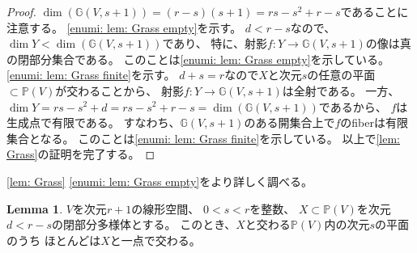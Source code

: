 \documentclass[uplatex]{jsarticle}
\theoremstyle{definition}
\newtheorem{lem}[lem]{Lemma}
\newcommand{\G}{\mathbb{G}}
\renewcommand{\P}{\mathbb{P}}
\begin{document}
\begin{proof}
  \(\dim (\G(V,s+1)) = (r-s)(s+1) = rs-s^2+r-s\)であることに注意する。
  \ref{enumi: lem: Grass empty}を示す。
  \(d<r-s\)なので、
  \(\dim Y < \dim(\G(V,s+1))\)であり、
  特に、射影\(f:Y\to \G(V,s+1)\)の像は真の閉部分集合である。
  このことは\ref{enumi: lem: Grass empty}を示している。
  \ref{enumi: lem: Grass finite}を示す。
  \(d+s=r\)なので\(X\)と次元\(s\)の任意の平面\(\subset \P(V)\)が交わることから、
  射影\(f:Y\to \G(V,s+1)\)は全射である。
  一方、\(\dim Y = rs-s^2+d = rs-s^2+r-s = \dim(\G(V,s+1))\)であるから、
  \(f\)は生成点で有限である。
  すなわち、\(\G(V,s+1)\)のある開集合上で\(f\)のfiberは有限集合となる。
  このことは\ref{enumi: lem: Grass finite}を示している。
  以上で\autoref{lem: Grass}の証明を完了する。
\end{proof}


\autoref{lem: Grass} \ref{enumi: lem: Grass empty}をより詳しく調べる。

\begin{lem}\label{lem: Grass 1pt}
  \(V\)を次元\(r+1\)の線形空間、
  \(0 < s < r\)を整数、
  \(X\subset \P(V)\)を次元\(d < r-s\)の閉部分多様体とする。
  このとき、\(X\)と交わる\(\P(V)\)内の次元\(s\)の平面のうち
  ほとんどは\(X\)と一点で交わる。
\end{lem}
\end{document}
